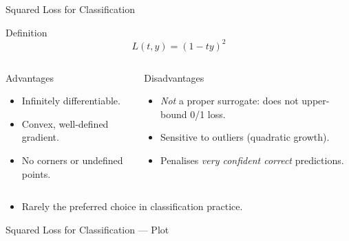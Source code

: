 \begin{frame}{Squared Loss for Classification}
  \begin{block}{Definition}
    \[
      L(t,y) = (1-ty)^2
    \]
  \end{block}

  \begin{columns}[T]
    \begin{block}{Advantages}
      \begin{itemize}
        \item Infinitely differentiable.
        \item Convex, well-defined gradient.
        \item No corners or undefined points.
      \end{itemize}
    \end{block}
    \begin{alertblock}{Disadvantages}
      \begin{itemize}
        \item \emph{Not} a proper surrogate: does not upper-bound 0/1 loss.
        \item Sensitive to outliers (quadratic growth).
        \item Penalises \emph{very confident correct} predictions.
      \end{itemize}
    \end{alertblock}
  \end{columns}

  \vspace{.4em}
  \begin{itemize}
    \item Rarely the preferred choice in classification practice.
  \end{itemize}
\end{frame}

\begin{frame}{Squared Loss for Classification — Plot}
  \begin{center}
  \end{center}
\end{frame}

